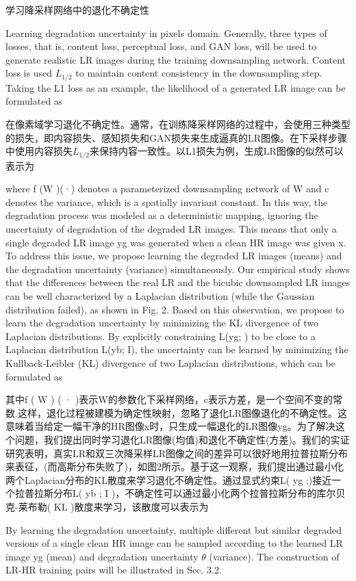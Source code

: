 学习降采样网络中的退化不确定性

Learning degradation uncertainty in pixels domain. Generally, three types of losses, that is, content loss, perceptual loss, and GAN loss, will be used to generate realistic LR images during the training downsampling network. Content loss is used $L_{1/2}$ to maintain content consistency in the downsampling step. Taking the L1 loss as an example, the likelihood of a generated LR image can be formulated as

在像素域学习退化不确定性。通常，在训练降采样网络的过程中，会使用三种类型的损失，即内容损失、感知损失和GAN损失来生成逼真的LR图像。在下采样步骤中使用内容损失$L_{1/2}$来保持内容一致性。以L1损失为例，生成LR图像的似然可以表示为

where f (W )(·) denotes a parameterized downsampling network of W and c denotes the variance, which is a spatially invariant constant. In this way, the degradation process was modeled as a deterministic mapping, ignoring the uncertainty of degradation of the degraded LR images. This means that only a single degraded LR image yg was generated when a clean HR image was given x. To address this issue, we propose learning the degraded LR images (means) and the degradation uncertainty (variance) simultaneously. Our empirical study shows that the differences between the real LR and the bicubic downsampled LR images can be well characterized by a Laplacian distribution (while the Gaussian distribution failed), as shown in Fig. 2. Based on this observation, we propose to learn the degradation uncertainty by minimizing the KL divergence of two Laplacian distributions. By explicitly constraining L(yg;  ) to be close to a Laplacian distribution L(yb; I), the uncertainty can be learned by minimizing the Kullback-Leibler (KL) divergence of two Laplacian distributions, which can be formulated as

其中f ( W ) ( · )表示W的参数化下采样网络，c表示方差，是一个空间不变的常数.这样，退化过程被建模为确定性映射，忽略了退化LR图像退化的不确定性。这意味着当给定一幅干净的HR图像x时，只生成一幅退化的LR图像yg。为了解决这个问题，我们提出同时学习退化LR图像(均值)和退化不确定性(方差)。我们的实证研究表明，真实LR和双三次降采样LR图像之间的差异可以很好地用拉普拉斯分布来表征，(而高斯分布失败了)，如图2所示。基于这一观察，我们提出通过最小化两个Laplacian分布的KL散度来学习退化不确定性。通过显式约束L( yg ;)接近一个拉普拉斯分布L( yb ; I )，不确定性可以通过最小化两个拉普拉斯分布的库尔贝克-莱布勒( KL )散度来学习，该散度可以表示为

By learning the degradation uncertainty, multiple different but similar degraded versions of a single clean HR image can be sampled according to the learned LR image yg (mean) and degradation uncertainty $\theta$ (variance). The construction of LR-HR training pairs will be illustrated in Sec. 3.2.

